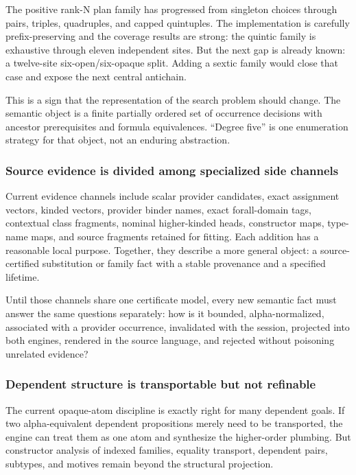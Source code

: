 \documentclass[11pt]{article}
\begin{document}
The positive rank-N plan family has progressed from singleton choices through
pairs, triples, quadruples, and capped quintuples.  The implementation is
carefully prefix-preserving and the coverage results are strong: the quintic
family is exhaustive through eleven independent sites.  But the next gap is
already known: a twelve-site six-open/six-opaque split.  Adding a sextic family
would close that case and expose the next central antichain.

This is a sign that the representation of the search problem should change.
The semantic object is a finite partially ordered set of occurrence decisions
with ancestor prerequisites and formula equivalences.  ``Degree five'' is one
enumeration strategy for that object, not an enduring abstraction.

\subsubsection{Source evidence is divided among specialized side channels}

Current evidence channels include scalar provider candidates, exact assignment
vectors, kinded vectors, provider binder names, exact forall-domain tags,
contextual class fragments, nominal higher-kinded heads, constructor maps,
type-name maps, and source fragments retained for fitting.  Each addition has a
reasonable local purpose.  Together, they describe a more general object: a
source-certified substitution or family fact with a stable provenance and a
specified lifetime.

Until those channels share one certificate model, every new semantic fact must
answer the same questions separately: how is it bounded, alpha-normalized,
associated with a provider occurrence, invalidated with the session, projected
into both engines, rendered in the source language, and rejected without
poisoning unrelated evidence?

\subsubsection{Dependent structure is transportable but not refinable}

The current opaque-atom discipline is exactly right for many dependent goals.
If two alpha-equivalent dependent propositions merely need to be transported,
the engine can treat them as one atom and synthesize the higher-order plumbing.
But constructor analysis of indexed families, equality transport, dependent
pairs, subtypes, and motives remain beyond the structural projection.
\end{document}
